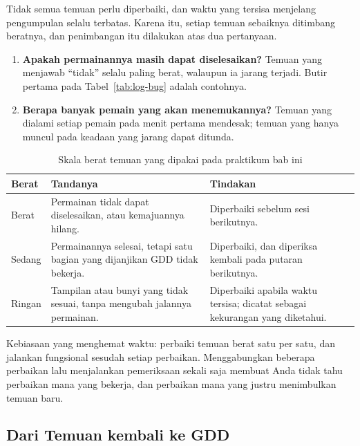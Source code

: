 Tidak semua temuan perlu diperbaiki, dan waktu yang tersisa menjelang
pengumpulan selalu terbatas. Karena itu, setiap temuan sebaiknya ditimbang
beratnya, dan penimbangan itu dilakukan atas dua pertanyaan.

\begin{enumerate}
  \item \textbf{Apakah permainannya masih dapat diselesaikan?} Temuan yang
        menjawab ``tidak'' selalu paling berat, walaupun ia jarang terjadi.
        Butir pertama pada Tabel~\ref{tab:log-bug} adalah contohnya.
  \item \textbf{Berapa banyak pemain yang akan menemukannya?} Temuan yang
        dialami setiap pemain pada menit pertama mendesak; temuan yang hanya
        muncul pada keadaan yang jarang dapat ditunda.
\end{enumerate}

\begin{table}[htbp]
\centering
\caption{Skala berat temuan yang dipakai pada praktikum bab ini}
\label{tab:berat-temuan}
{\setlength{\tabcolsep}{4pt}\footnotesize%
\begin{tabularx}{\textwidth}{@{}L{1.8cm} L{4.6cm} Y@{}}
\toprule
\headrow \textbf{Berat} & \textbf{Tandanya} & \textbf{Tindakan} \\
\midrule
Berat & Permainan tidak dapat diselesaikan, atau kemajuannya hilang. &
Diperbaiki sebelum sesi  berikutnya. \\
\addlinespace
Sedang & Permainannya selesai, tetapi satu bagian yang dijanjikan GDD tidak
bekerja. &
Diperbaiki, dan diperiksa kembali pada putaran berikutnya. \\
\addlinespace
Ringan & Tampilan atau bunyi yang tidak sesuai, tanpa mengubah jalannya
permainan. &
Diperbaiki apabila waktu tersisa; dicatat sebagai kekurangan yang diketahui. \\
\bottomrule
\end{tabularx}}
\end{table}

\begin{tipsbox}
Kebiasaan yang menghemat waktu: perbaiki temuan berat satu per satu, dan
jalankan  fungsional sesudah setiap perbaikan. Menggabungkan
beberapa perbaikan lalu menjalankan pemeriksaan sekali saja membuat Anda tidak
tahu perbaikan mana yang bekerja, dan perbaikan mana yang justru menimbulkan
temuan baru.
\end{tipsbox}

\subsection{Dari Temuan kembali ke GDD}

